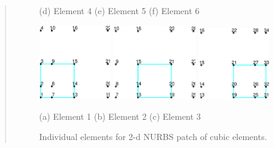 \begin{quote}
\begin{figure}[!b]
\begin{center}
\centerline{(d) Element 4 \hspace{0.7in} (e) Element 5 \hspace{0.7in} (f) Element 6}

\centerline{
\includegraphics[width=1.2in]{figs/mesh_3_e1} \hspace{0.2in}
\includegraphics[width=1.4in]{figs/mesh_3_e2} \hspace{0.2in}
\includegraphics[width=1.2in]{figs/mesh_3_e3}
}

\centerline{(a) Element 1 \hspace{0.7in} (b) Element 2 \hspace{0.7in} (c) Element 3}

\caption{Individual elements for 2-d NURBS patch of cubic elements.  \label{fig5ex4}}
\end{center}
\end{figure}

\end{quote}

